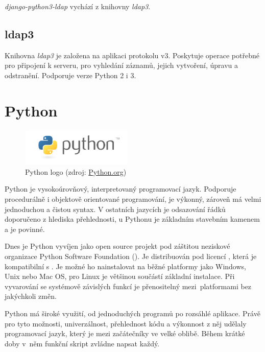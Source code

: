 \textit{django-python3-ldap} vychází z knihovny \textit{ldap3}.

\subsection{ldap3}
Knihovna \textit{ldap3} je založena na aplikaci protokolu  v3. Poskytuje operace potřebné pro připojení k  serveru, pro vyhledání záznamů, jejich vytvoření, úpravu a odstranění. Podporuje verze Python 2 i 3. 


\section{Python}

\begin{figure}[H] \centering
      \includegraphics[width=150pt]{./pictures/python-logo-master-v3-TM.png}
      \caption[Python logo]{Python logo (zdroj:
\href{https://www.python.org/static/community_logos/python-logo-master-v3-TM.png}{Python.org})}
      \label{fig:python}
  \end{figure}
  

Python je vysokoúrovňový, interpretovaný programovací jazyk. Podporuje
procedurálně i objektově orientované programování, je výkonný, zároveň
má velmi jednoduchou a čistou syntax. V ostatních jazycích je
odsazování řádků doporučeno z hlediska přehlednosti, u Pythonu je
základním stavebním kamenem a je povinné.\cite{Kulovana, 2017}

Dnes je Python vyvíjen jako open source projekt
pod záštitou neziskové organizace Python Software Foundation
(). Je distribuován pod licencí , která je
kompatibilní s . Je možné ho nainstalovat na běžné platformy
jako Windows, Unix nebo Mac OS, pro Linux je většinou součástí
základní instalace. Při vyvarování se systémově závislých funkcí je
přenositelný mezi~platformami bez jakýchkoli změn.

Python má široké využití, od jednoduchých programů po rozsáhlé
aplikace. Právě pro tyto možnosti, univerzálnost, přehlednost kódu a
výkonnost z něj udělaly programovací jazyk, který je mezi začátečníky ve
velké oblibě. Během krátké doby v~něm funkční skript zvládne napsat
každý.

